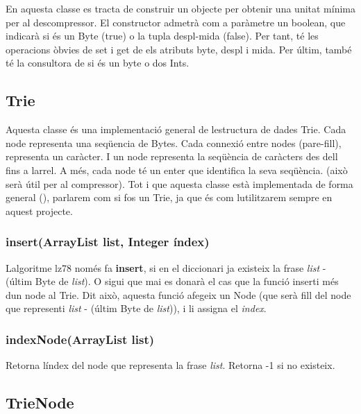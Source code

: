 En aquesta classe es tracta de construir un objecte per obtenir una unitat mínima per al descompressor. El constructor admetrà com a paràmetre un boolean, que indicarà si és un Byte (true) o la tupla despl-\/mida (false). Per tant, té les operacions òbvies de set i get de els atributs byte, despl i mida. Per últim, també té la consultora de si és un byte o dos Int\textquotesingle{}s.

\subsection*{Trie}

Aquesta classe és una implementació general de l\textquotesingle{}estructura de dades Trie. Cada node representa una seqüencia de Bytes. Cada connexió entre nodes (pare-\/fill), representa un caràcter. I un node representa la seqüència de caràcters des d\textquotesingle{}ell fins a l\textquotesingle{}arrel. A més, cada node té un enter que identifica la seva seqüència. (això serà útil per al compressor). Tot i que aquesta classe està implementada de forma general (), parlarem com si fos un Trie, ja que és com l\textquotesingle{}utilitzarem sempre en aquest projecte.

\subsubsection*{insert(Array\+List list, Integer índex)}

L\textquotesingle{}algoritme lz78 només fa {\bfseries insert}, si en el diccionari ja existeix la frase {\itshape list} -\/ (últim Byte de {\itshape list}). O sigui que mai es donarà el cas que la funció inserti més d\textquotesingle{}un node al Trie. Dit això, aquesta funció afegeix un Node (que serà fill del node que representi {\itshape list} -\/ (últim Byte de {\itshape list})), i li assigna el {\itshape index}.

\subsubsection*{index\+Node(\+Array\+List list)}

Retorna l\textquotesingle{}índex del node que representa la frase {\itshape list}. Retorna -\/1 si no existeix.

\subsection*{Trie\+Node}

